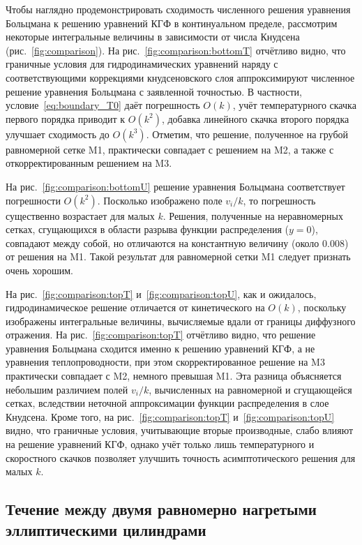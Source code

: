 \documentclass[
aps,%
12pt,%
final,%
notitlepage,%
oneside,%
onecolumn,%
nobibnotes,%
nofootinbib,%
superscriptaddress,%
noshowpacs,%
showkeys,%
tightenlines,%
centertags]%
{revtex4}
\newcommand{\OO}[1]{O(#1)}
\begin{document}
Чтобы наглядно продемонстрировать сходимость численного решения уравнения Больцмана к
решению уравнений КГФ в континуальном пределе, рассмотрим некоторые интегральные величины
в зависимости от числа Кнудсена (рис.~\ref{fig:comparison}).
На рис.~\ref{fig:comparison:bottomT} отчётливо видно, что граничные условия для гидродинамических уравнений
наряду с соответствующими коррекциями кнудсеновского слоя
аппроксимируют численное решение уравнения Больцмана с заявленной точностью.
В частности, условие~\eqref{eq:boundary_T0} даёт погрешность \(\OO{k}\),
учёт температурного скачка первого порядка приводит к \(\OO{k^2}\),
добавка линейного скачка второго порядка улучшает сходимость до \(\OO{k^3}\).
Отметим, что решение, полученное на грубой равномерной сетке M1, практически совпадает с решением на M2,
а также с откорректированным решением на M3.

На рис.~\ref{fig:comparison:bottomU} решение уравнения Больцмана соответствует погрешности \(\OO{k^2}\).
Посколько изображено поле \(v_i/k\), то погрешность существенно возрастает для малых \(k\).
Решения, полученные на неравномерных сетках, сгущающихся в области разрыва функции распределения (\(y=0\)),
совпадают между собой, но отличаются на константную величину (около 0.008) от решения на M1.
Такой результат для равномерной сетки M1 следует признать очень хорошим.

На рис.~\ref{fig:comparison:topT} и~\ref{fig:comparison:topU}, как и ожидалось, гидродинамическое решение
отличается от кинетического на \(\OO{k}\), поскольку изображены интегральные величины,
вычисляемые вдали от границы диффузного отражения.
На рис.~\ref{fig:comparison:topT} отчётливо видно, что решение уравнения Больцмана сходится
именно к решению уравнений КГФ, а не уравнения теплопроводности,
при этом скорректированное решение на M3 практически совпадает с M2, немного превышая M1.
Эта разница объясняется небольшим различием полей \(v_i/k\), вычисленных на равномерной и сгущающейся сетках,
вследствии неточной аппроксимации функции распределения в слое Кнудсена.
Кроме того, на рис.~\ref{fig:comparison:topT} и~\ref{fig:comparison:topU} видно,
что граничные условия, учитывающие вторые производные, слабо влияют на решение уравнений КГФ,
однако учёт только лишь температурного и скоростного скачков позволяет улучшить точность асимптотического решения
для малых \(k\).

\subsection{Течение между двумя равномерно нагретыми эллиптическими цилиндрами}
\end{document}
